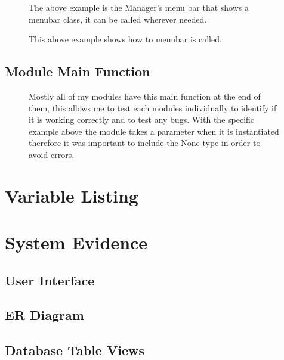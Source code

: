 \begin{figure}[H]
    \caption{The above example is the Manager's menu bar that shows a menubar class, it can be called wherever needed.} \label{fig:Dialog Class}
\end{figure}

\begin{figure}[H]
    \caption{This above example shows how to menubar is called.} \label{fig:Dialog Class}
\end{figure}

\subsection{Module Main Function}
 
 \begin{figure}[H]
    \caption{Mostly all of my modules have this main function at the end of them, this allows me to test each modules individually to identify if it is working correctly and to test any bugs. With the specific example above the module takes a parameter when it is instantiated therefore it was important to include the None type in order to avoid errors.} \label{fig:Dialog Class}
\end{figure}

\section{Variable Listing}

\section{System Evidence}

\subsection{User Interface}

\subsection{ER Diagram}

\subsection{Database Table Views}

